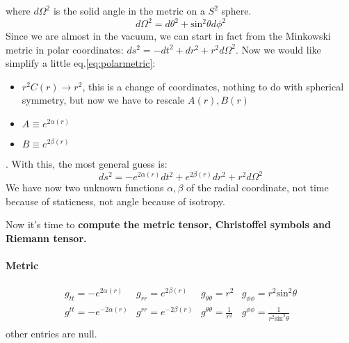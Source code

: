 where $d\Omega ^{2}$ is the solid angle in the metric on a $S^{2}$ sphere.
\[
	d\Omega ^{2} = d\theta ^{2} + \text{sin}^{2}\theta d\phi ^{2}
\]
Since we are almost in the vacuum, we can start in fact from the Minkowski metric in polar coordinates: $ds^{2 }=-dt^{2} +dr^{2}+r^{2}d\Omega ^{2} $.
Now we would like simplify a little eq.\ref{eq:polarmetric}:
\begin{itemize}
\item $r^{2}C\left( r \right) \to  r^{2}$, this is a change of coordinates, nothing to do with spherical symmetry, but now we have to rescale $A\left( r \right), B\left( r \right)$
\item $A \equiv e^{2\alpha \left( r \right)}$
\item $B\equiv e^{2\beta \left( r \right)}$
\end{itemize}.
With this, the most general guess is:
\begin{equation}\label{eq:pmetric2}
ds^{2} = -e^{2\alpha \left( r \right)}dt^{2} + e^{2\beta \left( r \right)}dr^{2} + r^{2}d\Omega ^{2}
\end{equation}
We have now two unknown functions $\alpha ,\beta $ of the radial coordinate, not time because of staticness, not angle because of isotropy.\par
Now it's time to \textbf{compute the metric tensor, Christoffel symbols and Riemann tensor.}\par
\paragraph{Metric} 
\begin{equation}
\begin{matrix} 
	g_{tt}= -e^{2\alpha \left( r \right)} & g_{rr}=e^{2\beta \left( r \right)} & g_{\theta \theta }= r^{2} & g_{\phi \phi } = r^{2}\text{sin}^{2}\theta  \\
	g^{tt}=-e^{-2\alpha \left( r \right)} & g^{rr}=e^{-2\beta \left( r \right)} & g^{\theta \theta }= \frac{1}{r^{2}} & g^{\phi \phi }=\frac{1}{r^{2}\text{sin}^{2}\theta } \\
\end{matrix}
\end{equation}
other entries are null.
